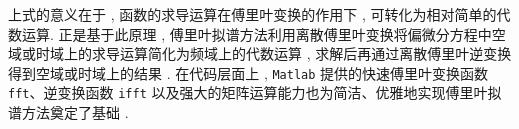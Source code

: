 上式的意义在于 , 函数的求导运算在傅里叶变换的作用下 , 可转化为相对简单的代数运算.
正是基于此原理 , 傅里叶拟谱方法利用离散傅里叶变换将偏微分方程中空域或时域上的求导运算简化为频域上的代数运算 , 
求解后再通过离散傅里叶逆变换得到空域或时域上的结果 . 在代码层面上 , \texttt{Matlab} 提供的快速傅里叶变换函数 \texttt{fft}、逆变换函数 \texttt{ifft} 以及强大的矩阵运算能力也为简洁、优雅地实现傅里叶拟谱方法奠定了基础 . 










